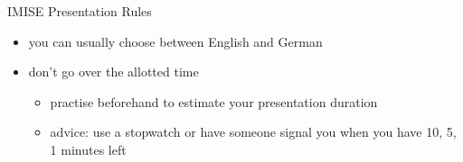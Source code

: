 \documentclass[aspectratio=1610]{beamer}
\begin{document}
\begin{frame}{IMISE Presentation Rules}
\begin{itemize}
\item you can usually choose between English and German
\item don't go over the allotted time
\begin{itemize}
\item practise beforehand to estimate your presentation duration 
\item advice: use a stopwatch or have someone signal you when you have 10, 5, 1 minutes left
\end{itemize}
\end{itemize}
\end{frame}
\end{document}

